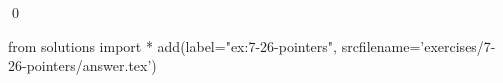 
\begin{ex}
  \label{ex:7-26-pointers}
  
  \qed
\end{ex}
\begin{python0}
from solutions import *
add(label="ex:7-26-pointers",
    srcfilename='exercises/7-26-pointers/answer.tex')
\end{python0}
